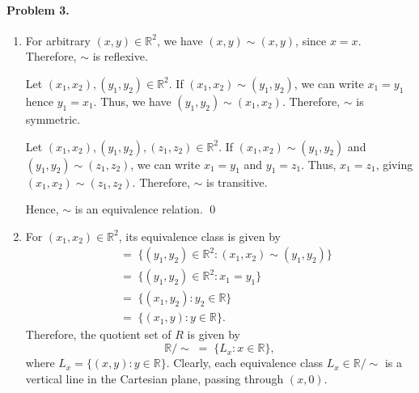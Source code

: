 \documentclass[10pt]{article}
\begin{document}
    \paragraph{Problem 3.}
    \begin{enumerate}
        \item For arbitrary $(x, y)\in\mathbb{R}^2$, we have $(x, y)\sim(x,
        y)$, since $x = x$. Therefore, $\sim$ is reflexive.

        Let $(x_1, x_2), (y_1, y_2) \in \mathbb{R}^2$. If $(x_1, x_2)\sim(y_1,
        y_2)$, we can write $x_1 = y_1$ hence $y_1 = x_1$. Thus, we have
        $(y_1, y_2)\sim(x_1, x_2)$. Therefore, $\sim$ is symmetric.

        Let $(x_1, x_2), (y_1, y_2), (z_1, z_2) \in \mathbb{R}^2$. If $(x_1,
        x_2)\sim(y_1, y_2)$ and $(y_1, y_2)\sim(z_1, z_2)$, we can write $x_1
        = y_1$ and $y_1 = z_1$. Thus, $x_1 = z_1$, giving $(x_1, x_2)\sim(z_1,
        z_2)$. Therefore, $\sim$ is transitive.

        Hence, $\sim$ is an equivalence relation. \qed

        \item For $(x_1, x_2) \in \mathbb{R}^2$, its equivalence class is
        given by \begin{align*}
            [(x_1, x_2)]
                \;&=\; \{(y_1, y_2) \in \mathbb{R}^2 : (x_1, x_2)\sim(y_1, y_2)\} \\
                \;&=\; \{(y_1, y_2) \in \mathbb{R}^2 : x_1 = y_1\}\\
                \;&=\; \{(x_1, y_2) : y_2 \in \mathbb{R}\} \\
                \;&=\; \{(x_1, y) : y \in \mathbb{R}\}.
        \end{align*}
        Therefore, the quotient set of $R$ is given by \[
            \mathbb{R}/\sim \;=\; \{L_x : x \in \mathbb{R}\},
        \] where $L_x = \{(x, y) : y \in
        \mathbb{R}\}$. Clearly, each equivalence class $L_x \in
        \mathbb{R}/\sim$ is a vertical line in the Cartesian plane, passing
        through $(x, 0)$.

        \begin{center}
        \end{center}
    \end{enumerate}
\end{document}
